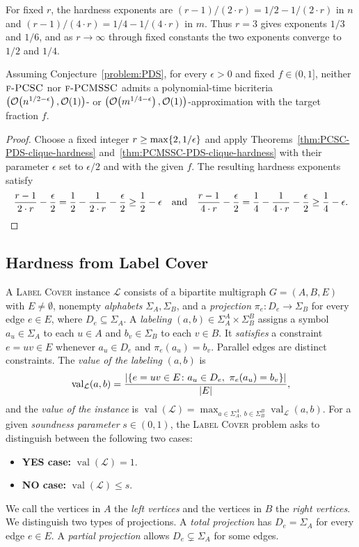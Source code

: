 For fixed $r$, the hardness exponents are $(r-1)/(2\cdot r)=1/2-1/(2\cdot r)$ in $n$ and $(r-1)/(4\cdot r)=1/4-1/(4\cdot r)$ in $m$. Thus $r=3$ gives exponents $1/3$ and $1/6$, and as $r\to\infty$ through fixed constants the two exponents converge to $1/2$ and $1/4$.
\begin{corollary}\label{cor:PDS-limiting-hardness}
    Assuming Conjecture~\ref{problem:PDS}, for every $\epsilon>0$ and fixed $f\in(0,1]$, neither $\textup{\textsc{f-PCSC}}$ nor $\textup{\textsc{f-PCMSSC}}$ admits a polynomial-time bicriteria $\mathopen{}\left( \mathcal{O}\mathopen{}\left( n^{1/2-\epsilon} \right),\mathcal{O}\mathopen{}\left( 1 \right) \right)$- or $\mathopen{}\left( \mathcal{O}\mathopen{}\left( m^{1/4-\epsilon} \right),\mathcal{O}\mathopen{}\left( 1 \right) \right)$-approximation with the target fraction $f$.
\end{corollary}
\begin{proof}
    Choose a fixed integer $r\geq\max\mathopen{}\left\{ 2,1/\epsilon \right\}$ and apply Theorems~\ref{thm:PCSC-PDS-clique-hardness} and~\ref{thm:PCMSSC-PDS-clique-hardness} with their parameter $\epsilon$ set to $\epsilon/2$ and with the given $f$. The resulting hardness exponents satisfy
    \[
        \frac{r-1}{2\cdot r}-\frac\epsilon2
        =\frac12-\frac{1}{2\cdot r}-\frac\epsilon2\geq\frac12-\epsilon
        \quad\text{and}\quad
        \frac{r-1}{4\cdot r}-\frac\epsilon2
        =\frac14-\frac{1}{4\cdot r}-\frac\epsilon2\geq\frac14-\epsilon.\qedhere
    \]
\end{proof}

\subsection{Hardness from Label Cover}
A \textup{\textsc{Label Cover}} instance $\mathcal L$ consists of a bipartite multigraph $G=(A,B,E)$ with $E\neq\emptyset$, nonempty \emph{alphabets} $\Sigma_A,\Sigma_B$, and a \emph{projection} $\pi_e\colon D_e\to\Sigma_B$ for every edge $e\in E$, where $D_e\subseteq\Sigma_A$. A \emph{labeling} $(a,b)\in\Sigma_A^A\times\Sigma_B^B$ assigns a symbol $a_u\in\Sigma_A$ to each $u\in A$ and $b_v\in\Sigma_B$ to each $v\in B$. It \emph{satisfies} a constraint $e=uv\in E$ whenever $a_u\in D_e$ and $\pi_e(a_u)=b_v$. Parallel edges are distinct constraints. The \emph{value of the labeling} $(a,b)$ is
\[
    \operatorname{val}_{\mathcal L}(a,b)
    =\frac{\spr{\{e=uv\in E\colon a_u\in D_e,\ \pi_e(a_u)=b_v\}}}{\spr{E}},
\]
and the \emph{value of the instance} is $\operatorname{val}(\mathcal L) =\max_{a\in\Sigma_A^A,\ b\in\Sigma_B^B}\operatorname{val}_{\mathcal L}(a,b)$. For a given \emph{soundness parameter} $s\in(0,1)$, the \textup{\textsc{Label Cover}} problem asks to distinguish between the following two cases:
\begin{itemize}
    \item \textbf{YES case:} $\operatorname{val}(\mathcal L)=1$.
    \item \textbf{NO case:} $\operatorname{val}(\mathcal L)\leq s$.
\end{itemize}
We call the vertices in $A$ the \emph{left vertices} and the vertices in $B$ the \emph{right vertices}.
We distinguish two types of projections. A \emph{total projection} has $D_e=\Sigma_A$ for every edge $e\in E$. A \emph{partial projection} allows $D_e\subsetneq\Sigma_A$ for some edges.

